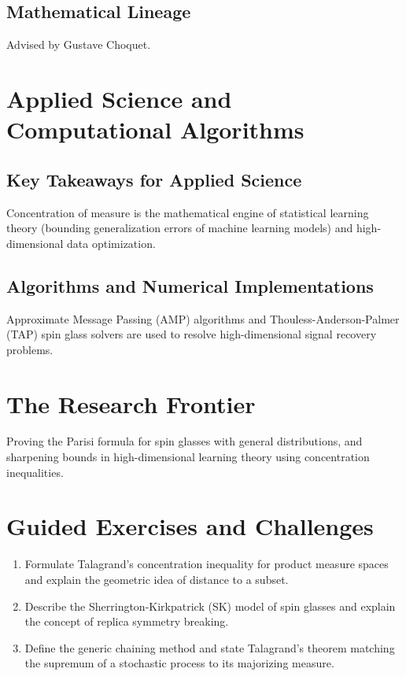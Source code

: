 \subsection{Mathematical Lineage}
Advised by Gustave Choquet.

\section{Applied Science and Computational Algorithms}
\subsection{Key Takeaways for Applied Science}
Concentration of measure is the mathematical engine of statistical learning theory (bounding generalization errors of machine learning models) and high-dimensional data optimization.

\subsection{Algorithms and Numerical Implementations}
Approximate Message Passing (AMP) algorithms and Thouless-Anderson-Palmer (TAP) spin glass solvers are used to resolve high-dimensional signal recovery problems.

\section{The Research Frontier}
Proving the Parisi formula for spin glasses with general distributions, and sharpening bounds in high-dimensional learning theory using concentration inequalities.

\section{Guided Exercises and Challenges}
\begin{enumerate}[label=\textbf{\arabic*.}]
  \item Formulate Talagrand's concentration inequality for product measure spaces and explain the geometric idea of distance to a subset.
  \item Describe the Sherrington-Kirkpatrick (SK) model of spin glasses and explain the concept of replica symmetry breaking.
  \item Define the generic chaining method and state Talagrand's theorem matching the supremum of a stochastic process to its majorizing measure.
\end{enumerate}

